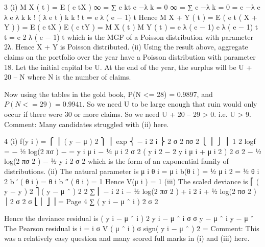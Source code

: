 \documentclass[a4paper,12pt]{article}
\begin{document}
3
(i)
M X ( t ) = E ( e tX )
∞
= ∑ e kt e −λ
k = 0
∞
= ∑ e −λ
k = 0
= e −λ e λ e
λ k
k !
( λ e t ) k
k !
t
= e λ ( e − 1)
t
Hence
M X + Y ( t ) = E ( e t ( X + Y ) )
= E ( e tX ) E ( e tY )
= M X ( t ) M Y ( t )
= e λ ( e − 1) e λ ( e − 1)
t
t
= e 2 λ ( e − 1)
t
which is the MGF of a Poisson distribution with parameter 2λ. Hence X + Y is
Poisson distributed.
(ii)
Using the result above, aggregate claims on the portfolio over the year have a Poisson distribution with parameter 18.
Let the initial capital be U. At the end of the year, the surplus will be U + 20 – N where N is the number of claims.

Now using the tables in the gold book, P(N <= 28) = 0.9897, and
$P(N < = 29) = 0.9941$.
So we need U to be large enough that ruin would only occur if there were 30
or more claims. So we need U + 20 – 29 > 0.
i.e. U > 9.
Comment: Many candidates struggled with (ii) here.

4
(i)
f(y i ) =
⎧ ⎪ ( y − μ ) 2 ⎫ ⎪
exp ⎨ − i 2 i ⎬
2 σ
2 πσ 2
⎩ ⎪
⎭ ⎪
1
2
logf = − 1⁄2 log(2 πσ ) −
=
y i μ i − 1⁄2 μ i 2
σ 2
( y i 2 − 2 y i μ i + μ i 2 )
2 σ 2
− 1⁄2 log(2 πσ 2 ) − 1⁄2
y i 2
σ 2
which is the form of an exponential family of distributions.
(ii)
The natural parameter is μ i
θ i = μ i
b(θ i ) = 1⁄2 μ i 2 = 1⁄2 θ i 2
b ′ ( θ i ) = θ i
b ′′ ( θ i ) = 1
Hence V(μ i ) = 1
(iii)
The scaled deviance is
⎡ ( y − y ) 2
⎤
( y − μ ˆ ) 2
2 ∑ ⎢ − i 2 i − 1⁄2 log(2 πσ 2 ) + i 2 i + 1⁄2 log(2 πσ 2 ) ⎥
2 σ
2 σ
⎣ ⎢
⎦ ⎥
=
Page 4
∑
( y i − μ ˆ i ) 2
σ 2

Hence the deviance residual is
( y i − μ ˆ i ) 2
y i − μ ˆ i
σ
σ
y − μ ˆ i
y − μ ˆ
The Pearson residual is i
= i
σ V ( μ ˆ i )
σ
sign( y i − μ ˆ )
2
=
Comment: This was a relatively easy question and many scored full marks in (i) and
(iii) here.
\end{document}
